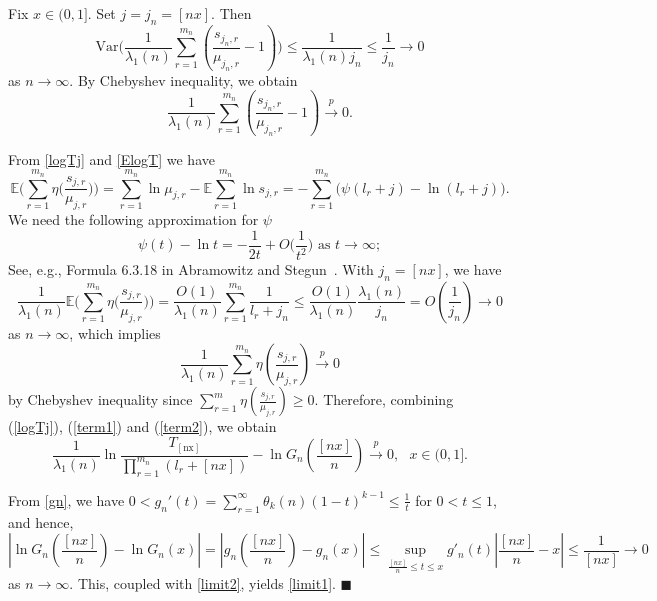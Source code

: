 \documentclass[11pt]{article}
\numberwithin{equation}{section}
\def\Var{\mathrm{Var}}
\begin{document}
Fix $x\in (0,1]$.  Set $j=j_n=[nx]$. Then
 \[
    \Var\Big(\frac{1}{\lambda_1(n)}\sum_{r=1}^{m_n}(\frac{s_{j_n, r}}{\mu_{j_n,
r}}-1)\Big)\le \frac{1}{\lambda_1(n)j_n}\le\frac{1}{j_n} \to 0
 \]
as $n\to\infty$. By Chebyshev inequality, we obtain
    \begin{equation}\label{term1}
    \frac{1}{\lambda_1(n)}\sum_{r=1}^{m_n}(\frac{s_{j_n, r}}{\mu_{j_n,
r}}-1) \stackrel{p}{\rightarrow} 0.
    \end{equation}

From \eqref{logTj} and \eqref{ElogT} we have
    \[
    \mathbb{E}\Big(\sum_{r=1}^{m_n} \eta\big(\frac{s_{j, r}}{\mu_{j, r}}\big)\Big)
            =\sum_{r=1}^{m_n} \ln \mu_{j, r}-\mathbb{E} \sum_{r=1}^{m_n} \ln s_{j, r}
           =-\sum_{r=1}^{m_n}\big(\psi(l_{r}+j)-\ln (l_{r}+j)\big).
     \]
We need the following approximation for $\psi$
\begin{equation*}
 \psi(t)-\ln t=-\frac{1}{2 t}+O\Big(\frac{1}{t^{2}}\Big) \mbox{ as }t\to
\infty;
\end{equation*}
See, e.g., Formula 6.3.18 in Abramowitz and
Stegun~\cite{Abramowitz1972}. With $j_n=[nx]$, we have
\[
\frac{1}{\lambda_1(n)}\mathbb{E}\Big(\sum_{r=1}^{m_n}
\eta\big(\frac{s_{j, r}}{\mu_{j, r}}\big)\Big)
=\frac{O(1)}{\lambda_1(n)}\sum_{r=1}^{m_n}\frac{1}{l_{r}+j_n}\le
\frac{O(1)}{\lambda_1(n)}\frac{\lambda_1(n)}{j_n}=O(\frac1{j_n})\to
0
 \]
as $n\to\infty$, which implies
    \begin{equation}\label{term2}
    \frac{1}{\lambda_1(n)}\sum_{r=1}^{m_n} \eta\left(\frac{s_{j, r}}{\mu_{j, r}}\right) \stackrel{p}{\rightarrow} 0
    \end{equation}
by Chebyshev inequality since $\sum_{r=1}^{m} \eta\left(\frac{s_{j,
r}}{\mu_{j, r}}\right)\ge 0$.   Therefore, combining (\ref{logTj}),
(\ref{term1}) and (\ref{term2}), we obtain
    \begin{equation}\label{limit2}
     \frac{1}{\lambda_1(n)} \ln \frac{T_{[\mathrm{nx}]}}{\prod_{r=1}^{m_n}(l_r+[nx])}-\ln G_n(\frac{[nx]}{n}) \stackrel{p}{\rightarrow} 0,
 ~~~ x \in (0,1].
    \end{equation}

From \eqref{gn}, we have
$0<g_n'(t)=\sum^\infty_{r=1}\theta_k(n)(1-t)^{k-1}\le \frac1{t}$ for
$0<t\le 1$, and hence,
\[
|\ln G_n(\frac{[nx]}{n})-\ln G_n(x)|=|g_n(\frac{[nx]}{n})-g_n(x)|\le
\sup_{\frac{[nx]}{n}\le t\le x}g'_n(t)|\frac{[nx]}{n}-x|\le
\frac{1}{[nx]}\to 0
\]
as $n\to\infty$. This, coupled with \eqref{limit2}, yields
\eqref{limit1}.
     \hfill$\blacksquare$
\end{document}
